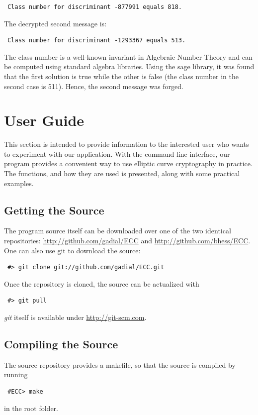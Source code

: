 \documentclass[11pt,english]{article}
\begin{document}
\begin{verbatim}
 Class number for discriminant -877991 equals 818.
\end{verbatim}

The decrypted second message is:

\begin{verbatim}
 Class number for discriminant -1293367 equals 513.
\end{verbatim}

The class number is a well-known invariant in Algebraic Number Theory and can be computed using standard algebra libraries. Using the sage library, it was found that the first solution is true while the other is false (the class number in the second case is 511). Hence, the second message was forged.

\section{User Guide}
\label{User Guide}
This section is intended to provide information to the interested user who wants to experiment with our application.
With the command line interface, our program provides a convenient way to use elliptic curve cryptography in practice. The functions, and how they are used is presented, along with some practical examples.

\subsection{Getting the Source}
The program source itself can be downloaded over one of the two identical repositories: \url{http://github.com/gadial/ECC} and \url{http://github.com/bhess/ECC}. One can also use git to download the source:
\begin{verbatim}
 #> git clone git://github.com/gadial/ECC.git
\end{verbatim}
Once the repository is cloned, the source can be actualized with
\begin{verbatim}
 #> git pull
\end{verbatim}
\emph{git} itself is available under \url{http://git-scm.com}.

\subsection{Compiling the Source}
The source repository provides a makefile, so that the source is compiled by running
\begin{verbatim}
 #ECC> make
\end{verbatim}
in the root folder.
\end{document}
